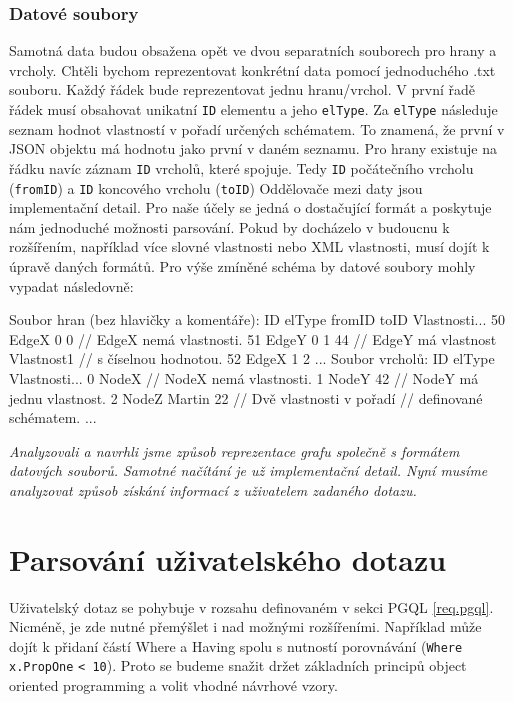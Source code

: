 \subsubsection{Datové soubory}

Samotná data budou obsažena opět ve dvou separatních souborech pro hrany a vrcholy.
Chtěli bychom reprezentovat konkrétní data pomocí jednoduchého .txt souboru.
Každý řádek bude reprezentovat jednu hranu/vrchol.
V první řadě řádek musí obsahovat unikatní \verb+ID+ elementu a jeho \verb+elType+. 
Za \verb+elType+ následuje seznam hodnot vlastností v pořadí určených schématem.
To znamená, že první v JSON objektu má hodnotu jako první v daném seznamu.
Pro hrany existuje na řádku navíc záznam \verb+ID+ vrcholů, které spojuje.
Tedy \texttt{ID} počátečního vrcholu (\texttt{fromID}) a \texttt{ID} koncového vrcholu (\texttt{toID}) 
Oddělovače mezi daty jsou implementační detail.
Pro naše účely se jedná o dostačující formát a poskytuje nám jednoduché možnosti parsování.
Pokud by docházelo v budoucnu k rozšířením, například více slovné vlastnosti nebo XML vlastnosti, musí dojít k úpravě daných formátů.
Pro výše zmíněné schéma by datové soubory mohly vypadat následovně:
\begin{code}
Soubor hran (bez hlavičky a komentáře):
ID elType fromID toID Vlastnosti... 
50 EdgeX 0 0    // EdgeX nemá vlastnosti.
51 EdgeY 0 1 44 // EdgeY má vlastnost Vlastnost1
                // s číselnou hodnotou.
52 EdgeX 1 2   
...
Soubor vrcholů:
ID elType Vlastnosti...
0 NodeX    // NodeX nemá vlastnosti.
1 NodeY 42 // NodeY má jednu vlastnost.
2 NodeZ Martin 22 // Dvě vlastnosti v pořadí
                  // definované schématem.
...
\end{code}

\bigskip
\textit{Analyzovali a navrhli jsme způsob reprezentace grafu společně s formátem datových souborů.
Samotné načítání je už implementační detail.
Nyní musíme analyzovat způsob získání informací z uživatelem zadaného dotazu. }

\section{Parsování uživatelského dotazu} \label{anal.parsing}

Uživatelský dotaz se pohybuje v rozsahu definovaném v sekci PGQL \ref{req.pgql}.
Nicméně, je zde nutné přemýšlet i nad možnými rozšířeními.
Například může dojít k přidaní částí Where a Having spolu s nutností porovnávání (\texttt{Where x.PropOne} \texttt{< 10}).
Proto se budeme snažit držet základních principů object oriented programming a volit vhodné návrhové vzory.

